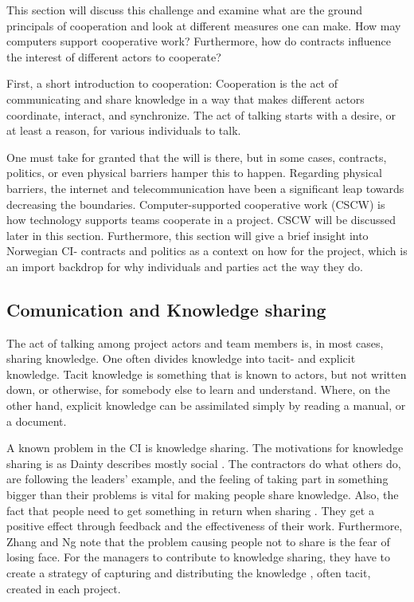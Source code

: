 This section will discuss this challenge and examine what are the ground principals of cooperation and look at different measures one can make. How may computers support cooperative work? Furthermore, how do contracts influence the interest of different actors to cooperate? 

First, a short introduction to cooperation: Cooperation is the act of communicating and share knowledge in a way that makes different actors coordinate, interact, and synchronize. The act of talking starts with a desire, or at least a reason, for various individuals to talk. 

One must take for granted that the will is there, but in some cases, contracts, politics, or even physical barriers hamper this to happen. Regarding physical barriers, the internet and telecommunication have been a significant leap towards decreasing the boundaries. Computer-supported cooperative work (CSCW) is how technology supports teams cooperate in a project. CSCW will be discussed later in this section. Furthermore, this section will give a brief insight into Norwegian CI- contracts and politics as a context on how for the project, which is an import backdrop for why individuals and parties act the way they do. 

\subsection{Comunication and Knowledge sharing}
The act of talking among project actors and team members is, in most cases, sharing knowledge. One often divides knowledge into tacit- and explicit knowledge. Tacit knowledge is something that is known to actors, but not written down, or otherwise, for somebody else to learn and understand. Where, on the other hand, explicit knowledge can be assimilated simply by reading a manual, or a document. 

A known problem in the CI is knowledge sharing. The motivations for knowledge sharing is as Dainty describes mostly social \cite{dainty2005hrm}. The contractors do what others do, are following the leaders' example, and the feeling of taking part in something bigger than their problems is vital for making people share knowledge. Also, the fact that people need to get something in return when sharing \cite{zhangAttitude}. They get a positive effect through feedback and the effectiveness of their work. Furthermore, Zhang and Ng note that the problem causing people not to share is the fear of losing face. For the managers to contribute to knowledge sharing, they have to create a strategy of capturing and distributing the knowledge \cite{kamara2002knowledge}, often tacit, created in each project.  

